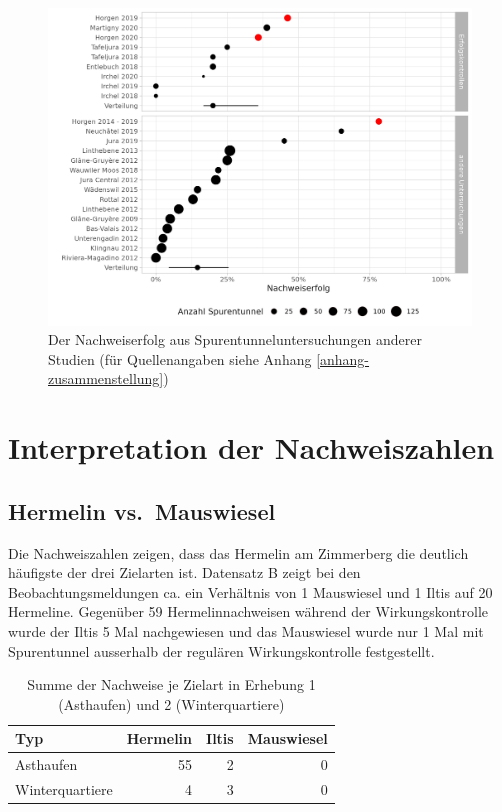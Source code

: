 \documentclass[
  oneside]{scrbook}
\begin{document}
\begin{figure}
\includegraphics[width=1\linewidth]{images/kontext} \caption{Der Nachweiserfolg aus Spurentunneluntersuchungen anderer Studien (für Quellenangaben siehe Anhang \ref{anhang-zusammenstellung})}\label{fig:kontext}
\end{figure}

\hypertarget{interpretation-der-nachweiszahlen}{%
\section{Interpretation der Nachweiszahlen}\label{interpretation-der-nachweiszahlen}}

\hypertarget{hermelin-vs.-mauswiesel}{%
\subsection{Hermelin vs.~Mauswiesel}\label{hermelin-vs.-mauswiesel}}

Die Nachweiszahlen zeigen, dass das Hermelin am Zimmerberg die deutlich häufigste der drei Zielarten ist. Datensatz B zeigt bei den Beobachtungsmeldungen ca. ein Verhältnis von 1 Mauswiesel und 1 Iltis auf 20 Hermeline.
Gegenüber 59 Hermelinnachweisen während der Wirkungskontrolle wurde der Iltis 5 Mal nachgewiesen und das Mauswiesel wurde nur 1 Mal mit Spurentunnel ausserhalb der regulären Wirkungskontrolle festgestellt.

\begin{table}

\caption{\label{tab:unnamed-chunk-10}Summe der Nachweise je Zielart in Erhebung 1 (Asthaufen) und 2 (Winterquartiere)}
\centering
\begin{tabular}[t]{l|r|r|r}
\hline
Typ & Hermelin & Iltis & Mauswiesel\\
\hline
Asthaufen & 55 & 2 & 0\\
\hline
Winterquartiere & 4 & 3 & 0\\
\hline
\end{tabular}
\end{table}
\end{document}
